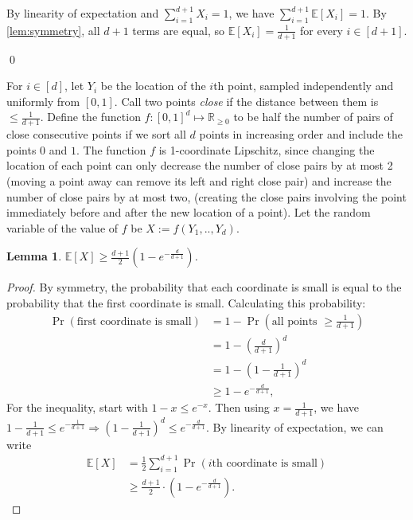 \documentclass[11pt,letterpaper]{article}
\newtheorem{lemma}[theorem]{Lemma}
\theoremstyle{definition}
\newcommand{\reals}{\mathbb{R}}
\newcommand{\EE}{\mathbb{E}}
\begin{document}
By linearity of expectation and $\sum_{i=1}^{d+1}X_i = 1$, we have $\sum_{i=1}^{d+1}\EE[X_i] = 1$.
By \cref{lem:symmetry}, all $d+1$ terms are equal, so $\EE[X_i] = \frac{1}{d+1}$ for every $i\in[d+1]$.

\qed

For $i\in [d]$, let $Y_i$ be the location of the $i$th point, sampled independently and uniformly from $[0,1]$.
Call two points \emph{close} if the distance between them is $\leq \frac{1}{d+1}$.
Define the function $f: [0,1]^d \mapsto \reals_{\geq 0}$ to be half the number of pairs of close consecutive points if we sort all $d$ points in increasing order and include the points $0$ and $1$.
The function $f$ is 1-coordinate Lipschitz, since changing the location of each point can only decrease the number of close pairs by at most 2 (moving a point away can remove its left and right close pair) and increase the number of close pairs by at most two, (creating the close pairs involving the point immediately before and after the new location of a point).
Let the random variable of the value of $f$ be $X:= f(Y_1,.., Y_d)$.

\begin{lemma}
    $\EE[X] \geq \frac{d+1}{2}\left(1-e^{-\frac{d}{d+1}}\right)$.
\end{lemma}
\begin{proof}
    By symmetry, the probability that each coordinate is small is equal to the probability that the first coordinate is small.
    Calculating this probability:
    \begin{align*}
        \Pr(\text{first coordinate is small}) &= 1- \Pr\left(\text{all points }\geq \frac{1}{d+1}\right) \\
        &= 1- \left(\frac{d}{d+1}\right)^d \\
        &= 1- \left(1-\frac{1}{d+1}\right)^{d} \\
        &\geq 1-e^{-\frac{d}{d+1}},
    \end{align*}
    For the inequality, start with $1-x\leq e^{-x}$.
    Then using $x=\frac{1}{d+1}$, we have $1-\frac{1}{d+1}\leq e^{-\frac{1}{d+1}} \Rightarrow \left(1-\frac{1}{d+1}\right)^d\leq e^{-\frac{d}{d+1}}$.
    By linearity of expectation, we can write 
    \begin{align*}
        \EE[X] &= \frac{1}{2}\sum_{i=1}^{d+1} \Pr(i\text{th coordinate is small}) \\
        &\geq \frac{d+1}{2}\cdot \left(1-e^{-\frac{d}{d+1}}\right).
    \end{align*}
\end{proof}
\end{document}
